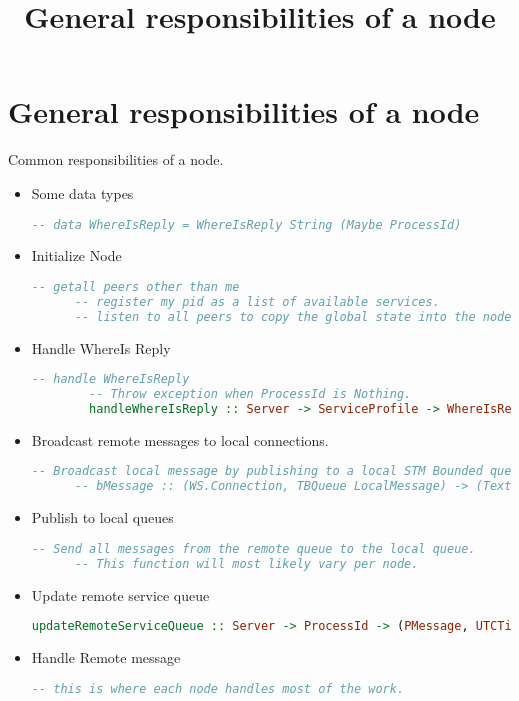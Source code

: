 \documentclass[11pt, twoside, a4paper]{article}
\begin{document}
\title{General responsibilities of a node}
\section {General responsibilities of a node}
Common responsibilities of a node.
\begin{itemize}
  \item Some data types
  \begin{lstlisting}[language=Haskell]
      -- data WhereIsReply = WhereIsReply String (Maybe ProcessId)
  \end{lstlisting}

  \item Initialize Node 
    \begin{lstlisting}[language=Haskell]
      -- getall peers other than me 
      -- register my pid as a list of available services.
      -- listen to all peers to copy the global state into the node.
    \end{lstlisting}
  \item Handle WhereIs Reply
    \begin{lstlisting}[language=Haskell]
        -- handle WhereIsReply
        -- Throw exception when ProcessId is Nothing.
        handleWhereIsReply :: Server -> ServiceProfile -> WhereIsReply -> Process ()
    \end{lstlisting}
  \item Broadcast remote messages to local connections.
    \begin{lstlisting}[language=Haskell]
      -- Broadcast local message by publishing to a local STM Bounded queue.
      -- bMessage :: (WS.Connection, TBQueue LocalMessage) -> (Text -> ProcessId -> LocalMessage) -> BroadcastMessageT LocalMessage
    \end{lstlisting}
  \item Publish to local queues
    \begin{lstlisting}[language=Haskell]
      -- Send all messages from the remote queue to the local queue. 
      -- This function will most likely vary per node.
    \end{lstlisting}
  \item Update remote service queue
    \begin{lstlisting}[language=Haskell]
      updateRemoteServiceQueue :: Server -> ProcessId -> (PMessage, UTCTime) -> STM ProcessId
    \end{lstlisting}
  \item Handle Remote message 
    \begin{lstlisting}[language=Haskell]
      -- this is where each node handles most of the work.
    \end{lstlisting}

\end{itemize}
\end{document}
